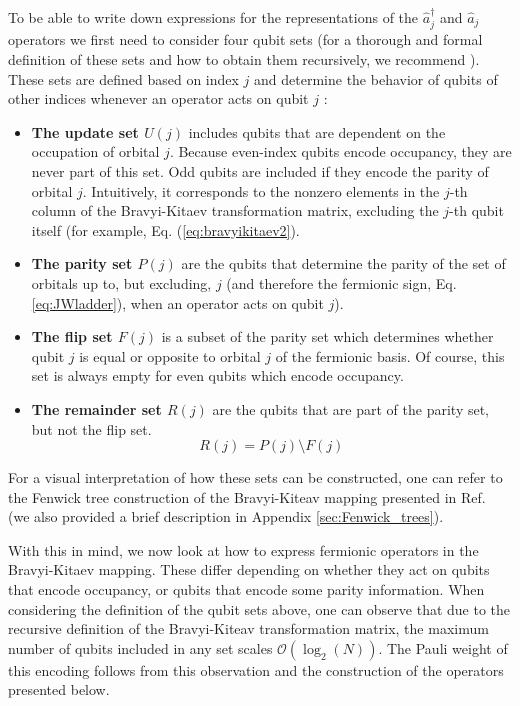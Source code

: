 To be able to write down expressions for the representations of the $\hat{a}^\dagger_j$ and $\hat{a}_j$ operators we first need to consider four qubit sets (for a thorough and formal definition of these sets and how to obtain them recursively, we recommend \cite{Seeley2012, Tranter2015}). These sets are defined based on index $j$ and determine the behavior of qubits of other indices whenever an operator acts on qubit $j$ :
\begin{itemize}
  \item \textbf{The update set $U(j)$} includes qubits that are dependent on the occupation of orbital $j$. Because even-index qubits encode occupancy, they are never part of this set. Odd qubits are included if they encode the parity of orbital $j$. Intuitively, it corresponds to the nonzero elements in the $j$-th column of the Bravyi-Kitaev transformation matrix, excluding the $j$-th qubit itself (for example, Eq. (\ref{eq:bravyikitaev2}). 
  \item \textbf{The parity set $P(j)$} are the qubits that determine the parity of the set of orbitals up to, but excluding, $j$ (and therefore the fermionic sign, Eq. \ref{eq:JWladder}), when an operator acts on qubit $j$). 
  \item \textbf{The flip set $F(j)$} is a subset of the parity set which determines whether qubit $j$ is equal or opposite to orbital $j$ of the fermionic basis. Of course, this set is always empty for even qubits which encode occupancy. 
  \item \textbf{The remainder set $R(j)$} are the qubits that are part of the parity set, but not the flip set.
  \begin{equation}
      R(j) = P(j) \setminus F(j)
  \end{equation}
\end{itemize}
For a visual interpretation of how these sets can be constructed, one can refer to the Fenwick tree construction of the Bravyi-Kiteav mapping presented in Ref.~\cite{Havlek2017} (we also provided a brief description in Appendix \ref{sec:Fenwick_trees}).

With this in mind, we now look at how to express fermionic operators in the Bravyi-Kitaev mapping. These differ depending on whether they act on qubits that encode occupancy, or qubits that encode some parity information. When considering the definition of the qubit sets above, one can observe that due to the recursive definition of the Bravyi-Kiteav transformation matrix, the maximum number of qubits included in any set scales $\mathcal{O}(\log_2(N))$. The Pauli weight of this encoding follows from this observation and the construction of the operators presented below.

